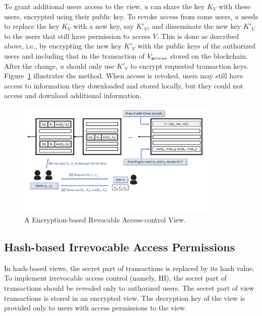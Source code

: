 To grant additional users access to the view, $u$ can share the key $K_V$ with these users, encrypted using their public key.
To revoke access from some users, $u$ needs to replace the key $K_V$ with a new key, say $K'_V$, and disseminate the new key $K'_V$ to the users that still have permission to access $V$. This is done as described above, i.e., by encrypting the new key $K'_V$ with the public keys of the authorized users and including that in the transaction of $V_{\texttt access\/}$ stored on the blockchain. After the change, $u$ should only use $K'_V$ to encrypt requested transaction keys.    Figure~\ref{diagram:view:enc_revocable} illustrates the method. When access is revoked, users may still have access to information they downloaded and stored locally, but they could not access and download additional information.

   
\begin{figure}[t]
    \centering
    \includegraphics[trim=0 50 0 0, clip,width=0.87\textwidth]{diagram/view/enc_revocable.png}
    \caption{A Encryption-based Revocable Access-control View. }
    \label{diagram:view:enc_revocable}
\end{figure}





\subsection{Hash-based Irrevocable Access Permissions}
\label{ch:view:ac_views:hash_irrevocable}

In hash-based views, the secret part of transactions %
is replaced by its hash value. 
To implement irrevocable access control (namely, HI), the secret part of transactions should be revealed only to authorized users. 
The secret part of view transactions is stored in an encrypted view. The decryption key of the view is provided only to users with access permissions to the view. 

